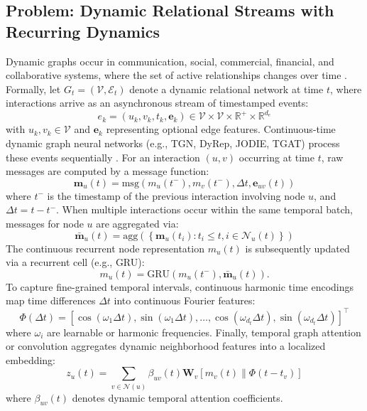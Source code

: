 \documentclass[conference]{IEEEtran}
\begin{document}
\subsection{Problem: Dynamic Relational Streams with Recurring Dynamics}
Dynamic graphs occur in communication, social, commercial, financial, and collaborative systems, where the set of active relationships changes over time \cite{kazemi2020representation, zhang2026survey}. Formally, let $G_t = (\mathcal{V}, \mathcal{E}_t)$ denote a dynamic relational network at time $t$, where interactions arrive as an asynchronous stream of timestamped events:
\begin{equation}
\label{eq:event_stream}
e_k = (u_k, v_k, t_k, \mathbf{e}_k) \in \mathcal{V} \times \mathcal{V} \times \mathbb{R}^+ \times \mathbb{R}^{d_e}
\end{equation}
with $u_k, v_k \in \mathcal{V}$ and $\mathbf{e}_k$ representing optional edge features. Continuous-time dynamic graph neural networks (e.g., TGN, DyRep, JODIE, TGAT) process these events sequentially \cite{rossi2020tgn, trivedi2019dyrep, kumar2019jodie, xu2020tgat}. For an interaction $(u, v)$ occurring at time $t$, raw messages are computed by a message function:
\begin{equation}
\label{eq:msg_func}
\mathbf{m}_u(t) = \text{msg}\left(m_u(t^-), m_v(t^-), \Delta t, \mathbf{e}_{uv}(t)\right)
\end{equation}
where $t^-$ is the timestamp of the previous interaction involving node $u$, and $\Delta t = t - t^-$. When multiple interactions occur within the same temporal batch, messages for node $u$ are aggregated via:
\begin{equation}
\label{eq:msg_agg}
\bar{\mathbf{m}}_u(t) = \text{agg}\left(\left\{\mathbf{m}_u(t_i) : t_i \le t, i \in \mathcal{N}_u(t)\right\}\right)
\end{equation}
The continuous recurrent node representation $m_u(t)$ is subsequently updated via a recurrent cell (e.g., GRU):
\begin{equation}
\label{eq:gru_update}
m_u(t) = \text{GRU}\left(m_u(t^-), \bar{\mathbf{m}}_u(t)\right).
\end{equation}
To capture fine-grained temporal intervals, continuous harmonic time encodings map time differences $\Delta t$ into continuous Fourier features:
\begin{equation}
\label{eq:time_encode}
\Phi(\Delta t) = \left[\cos(\omega_1 \Delta t), \sin(\omega_1 \Delta t), \dots, \cos(\omega_{d_t} \Delta t), \sin(\omega_{d_t} \Delta t)\right]^\top
\end{equation}
where $\omega_i$ are learnable or harmonic frequencies. Finally, temporal graph attention or convolution aggregates dynamic neighborhood features into a localized embedding:
\begin{equation}
\label{eq:gnn_conv}
z_u(t) = \sum_{v \in \mathcal{N}(u)} \beta_{uv}(t) \mathbf{W}_v \left[ m_v(t) \parallel \Phi(t - t_v) \right]
\end{equation}
where $\beta_{uv}(t)$ denotes dynamic temporal attention coefficients. 
\end{document}
